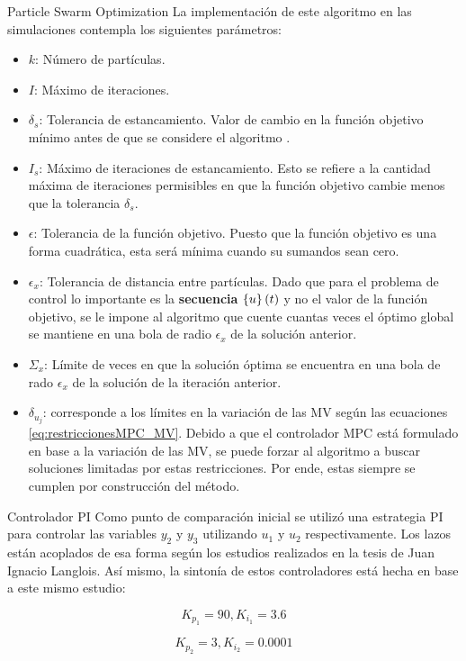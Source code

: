\documentclass{beamer}
\begin{document}
\begin{myFrame}{Particle Swarm Optimization}
La implementación de este algoritmo en las simulaciones contempla los siguientes parámetros:
\begin{itemize}
\item $k$: Número de partículas.
\item $I$: Máximo de iteraciones.
\item $\delta_s$: Tolerancia de estancamiento. Valor de cambio en la función objetivo mínimo antes de que se considere el algoritmo .
\item $I_s$: Máximo de iteraciones de estancamiento. Esto se refiere a la cantidad máxima de iteraciones permisibles en que la función objetivo cambie menos que la tolerancia $\delta_s$.
\item $\epsilon$: Tolerancia de la función objetivo. Puesto que la función objetivo es una forma cuadrática, esta será mínima cuando su sumandos sean cero.
\item $\epsilon_x$: Tolerancia de distancia entre partículas. Dado que para el problema de control lo importante es la \textbf{secuencia} $\left\lbrace u \right\rbrace(t)$ y no el valor de la función objetivo, se le impone al algoritmo que cuente cuantas veces el óptimo global se mantiene en una bola de radio $\epsilon_x$ de la solución anterior.
\item $\Sigma_x$: Límite de veces en que la solución óptima se encuentra en una bola de rado $\epsilon_x$ de la solución de la iteración anterior.
\item $\delta_{u_{j}}$: corresponde a los límites en la variación de las MV según las ecuaciones \ref{eq:restriccionesMPC_MV}. Debido a que el controlador MPC está formulado en base a la variación de las MV, se puede forzar al algoritmo a buscar soluciones limitadas por estas restricciones. Por ende, estas siempre se cumplen por construcción del método.
\end{itemize}
\end{myFrame}
\begin{myFrame}{Controlador PI}
Como punto de comparación inicial se utilizó una estrategia PI para controlar las variables $y_2$ y $y_3$ utilizando $u_1$ y $u_2$ respectivamente. Los lazos están acoplados de esa forma según los estudios realizados en la tesis de Juan Ignacio Langlois. Así mismo, la sintonía de estos controladores está hecha en base a este mismo estudio:

$$K_{p_1} = 90, K_{i_1} = 3.6$$

$$K_{p_2} = 3, K_{i_2} = 0.0001$$
\end{myFrame}
\end{document}
